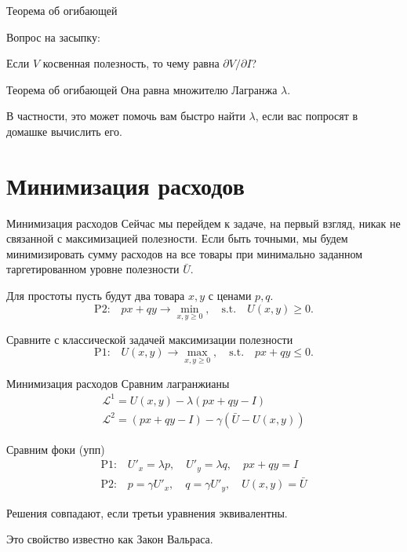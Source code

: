 \documentclass{beamer}
\begin{document}
\begin{frame}{Теорема об огибающей}

Вопрос на засыпку: 

Если $V$ косвенная полезность, то чему равна $\partial V/ \partial I$?
\end{frame}

\begin{frame}{Теорема об огибающей}
Она равна множителю Лагранжа $\lambda$.

В частности, это может помочь вам быстро найти $\lambda$, если вас попросят в домашке вычислить его.
\end{frame}

\section{Минимизация расходов}

\begin{frame}{Минимизация расходов}
Сейчас мы перейдем к задаче, на первый взгляд, никак не связанной с максимизацией полезности. Если быть точными, мы будем минимизировать сумму расходов на все товары при минимально заданном таргетированном уровне полезности $\bar U$. 

Для простоты пусть будут два товара $x, y$ с ценами $p, q$. 
$$\text{P2:} \quad p x + q y \to \min_{x,y \geqslant 0}, \quad \text{s.t.} \quad U(x,y) \geqslant 0.$$

Сравните с классической задачей максимизации полезности
$$\text{P1:} \quad U(x, y) \to \max_{x,y \geqslant 0}, \quad \text{s.t.} \quad p x + q y \leqslant 0.$$
\end{frame}

\begin{frame}{Минимизация расходов}
Сравним лагранжианы
\begin{gather*}
\mathcal{L}^{1} = U(x, y) - \lambda (px + qy - I)\\
\mathcal{L}^{2} = (px + qy - I) - \gamma (\bar U - U(x,y))
\end{gather*}

Сравним фоки (упп)
\begin{gather*}
\text{P1:} \quad U'_x = \lambda p, \quad U'_y = \lambda q, \quad px + qy = I\\
\text{P2:} \quad p = \gamma U'_x, \quad q = \gamma U'_y, \quad U(x,y) = \bar U
\end{gather*}

Решения совпадают, если третьи уравнения эквивалентны.

Это свойство известно как Закон Вальраса.
\end{frame}
\end{document}
